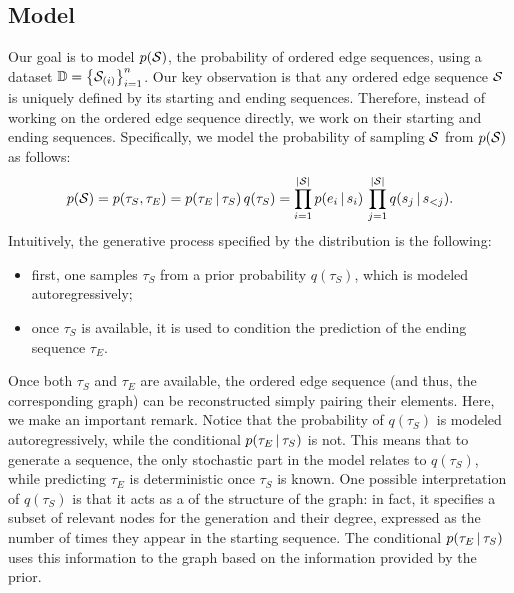 \subsection{Model}
Our goal is to model $p(\OES{S})$, the probability of ordered edge sequences, using a dataset $\Data = \Set{\OES{S}_{(i)}}_{i=1}^n$. Our key observation is that any ordered edge sequence $\OES{S}$ is uniquely defined by its starting and ending sequences. Therefore, instead of working on the ordered edge sequence directly, we work on their starting and ending sequences. Specifically, we model the probability of sampling $\OES{S}$ from $p(\OES{S})$ as follows:
$$p(\OES{S}) = p(\tau_S, \tau_E) = p(\tau_E \given \tau_S)\, q(\tau_S) = \prod_{i=1}^{|\OES{S}|} p(e_i \given s_i)\, \prod_{j=1}^{|\OES{S}|} q(s_j \given s_{<j}).$$
Intuitively, the generative process specified by the distribution is the following:
\begin{itemize}
    \item first, one samples $\tau_S$ from a prior probability $q(\tau_S)$, which is modeled autoregressively;
    \item once $\tau_S$ is available, it is used to condition the prediction of the ending sequence $\tau_E$.
\end{itemize}
Once both $\tau_S$ and $\tau_E$ are available, the ordered edge sequence (and thus, the corresponding graph) can be reconstructed simply pairing their elements. Here, we make an important remark. Notice that the probability of $q(\tau_S)$ is modeled autoregressively, while the conditional $p(\tau_E \,|\, \tau_S)$ is not. This means that to generate a sequence, the only stochastic part in the model relates to $q(\tau_S)$, while predicting $\tau_E$ is deterministic once $\tau_S$ is known. One possible interpretation of $q(\tau_S)$ is that it acts as a  of the structure of the graph: in fact, it specifies a subset of relevant nodes for the generation and their degree, expressed as the number of times they appear in the starting sequence. The conditional $p(\tau_E \,|\, \tau_S)$ uses this information to  the graph based on the information provided by the prior.


